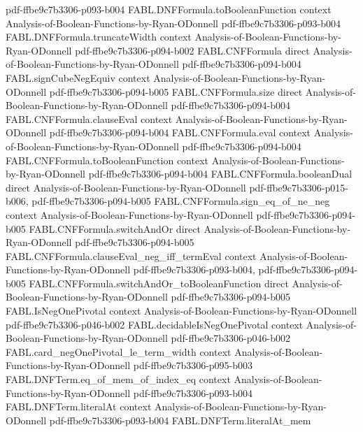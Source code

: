 \begin{theorem}
  {pdf-ffbe9c7b3306-p093-b004}
\proofstep
  {FABL.DNFFormula.toBooleanFunction}
  {context}
  {Analysis-of-Boolean-Functions-by-Ryan-ODonnell}
  {pdf-ffbe9c7b3306-p093-b004}
\proofstep
  {FABL.DNFFormula.truncateWidth}
  {context}
  {Analysis-of-Boolean-Functions-by-Ryan-ODonnell}
  {pdf-ffbe9c7b3306-p094-b002}
\proofstep
  {FABL.CNFFormula}
  {direct}
  {Analysis-of-Boolean-Functions-by-Ryan-ODonnell}
  {pdf-ffbe9c7b3306-p094-b004}
\proofstep
  {FABL.signCubeNegEquiv}
  {context}
  {Analysis-of-Boolean-Functions-by-Ryan-ODonnell}
  {pdf-ffbe9c7b3306-p094-b005}
\proofstep
  {FABL.CNFFormula.size}
  {direct}
  {Analysis-of-Boolean-Functions-by-Ryan-ODonnell}
  {pdf-ffbe9c7b3306-p094-b004}
\proofstep
  {FABL.CNFFormula.clauseEval}
  {context}
  {Analysis-of-Boolean-Functions-by-Ryan-ODonnell}
  {pdf-ffbe9c7b3306-p094-b004}
\proofstep
  {FABL.CNFFormula.eval}
  {context}
  {Analysis-of-Boolean-Functions-by-Ryan-ODonnell}
  {pdf-ffbe9c7b3306-p094-b004}
\proofstep
  {FABL.CNFFormula.toBooleanFunction}
  {context}
  {Analysis-of-Boolean-Functions-by-Ryan-ODonnell}
  {pdf-ffbe9c7b3306-p094-b004}
\proofstep
  {FABL.CNFFormula.booleanDual}
  {direct}
  {Analysis-of-Boolean-Functions-by-Ryan-ODonnell}
  {pdf-ffbe9c7b3306-p015-b006,
    pdf-ffbe9c7b3306-p094-b005}
\proofstep
  {FABL.CNFFormula.sign_eq_of_ne_neg}
  {context}
  {Analysis-of-Boolean-Functions-by-Ryan-ODonnell}
  {pdf-ffbe9c7b3306-p094-b005}
\proofstep
  {FABL.CNFFormula.switchAndOr}
  {direct}
  {Analysis-of-Boolean-Functions-by-Ryan-ODonnell}
  {pdf-ffbe9c7b3306-p094-b005}
\proofstep
  {FABL.CNFFormula.clauseEval_neg_iff_termEval}
  {context}
  {Analysis-of-Boolean-Functions-by-Ryan-ODonnell}
  {pdf-ffbe9c7b3306-p093-b004,
    pdf-ffbe9c7b3306-p094-b005}
\proofstep
  {FABL.CNFFormula.switchAndOr_toBooleanFunction}
  {direct}
  {Analysis-of-Boolean-Functions-by-Ryan-ODonnell}
  {pdf-ffbe9c7b3306-p094-b005}
\proofstep
  {FABL.IsNegOnePivotal}
  {context}
  {Analysis-of-Boolean-Functions-by-Ryan-ODonnell}
  {pdf-ffbe9c7b3306-p046-b002}
\proofstep
  {FABL.decidableIsNegOnePivotal}
  {context}
  {Analysis-of-Boolean-Functions-by-Ryan-ODonnell}
  {pdf-ffbe9c7b3306-p046-b002}
\proofstep
  {FABL.card_negOnePivotal_le_term_width}
  {context}
  {Analysis-of-Boolean-Functions-by-Ryan-ODonnell}
  {pdf-ffbe9c7b3306-p095-b003}
\proofstep
  {FABL.DNFTerm.eq_of_mem_of_index_eq}
  {context}
  {Analysis-of-Boolean-Functions-by-Ryan-ODonnell}
  {pdf-ffbe9c7b3306-p093-b004}
\proofstep
  {FABL.DNFTerm.literalAt}
  {context}
  {Analysis-of-Boolean-Functions-by-Ryan-ODonnell}
  {pdf-ffbe9c7b3306-p093-b004}
\proofstep
  {FABL.DNFTerm.literalAt_mem}

\end{theorem}

